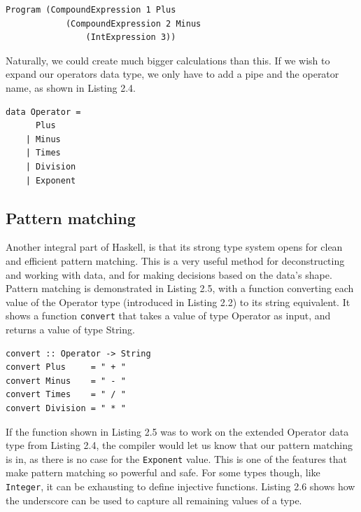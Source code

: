 \begin{lstlisting}[caption={An AST constructed with data types presented in Listing 2.2}, captionpos=b]
Program (CompoundExpression 1 Plus
            (CompoundExpression 2 Minus
                (IntExpression 3))
\end{lstlisting}

Naturally, we could create much bigger calculations than this. If we wish to expand our operators data type, we only have to add a pipe and the operator name, as shown in Listing 2.4. \hfill \\

\begin{lstlisting}[caption={An extended version of the Operator data type presented in Listing 2.2}, captionpos=b]
data Operator =
      Plus
    | Minus
    | Times
    | Division
    | Exponent
\end{lstlisting}

\subsection{Pattern matching}

Another integral part of Haskell, is that its strong type system opens for clean and efficient pattern matching. This is a very useful method for deconstructing and working with data, and for making decisions based on the data's shape. \hfill \\

Pattern matching is demonstrated in Listing 2.5, with a function converting each value of the Operator type (introduced in Listing 2.2) to its string equivalent. It shows a function \texttt{convert} that takes a value of type Operator as input, and returns a value of type String. \hfill \\

\begin{lstlisting}[caption={Haskell function converting values of one type to another}, captionpos=b]
convert :: Operator -> String
convert Plus     = " + "
convert Minus    = " - "
convert Times    = " / "
convert Division = " * "
\end{lstlisting}

If the function shown in Listing 2.5 was to work on the extended Operator data type from Listing 2.4, the compiler would let us know that our pattern matching is in, as there is no case for the \texttt{Exponent} value. This is one of the features that make pattern matching so powerful and safe. For some types though, like \texttt{Integer}, it can be exhausting to define injective functions. Listing 2.6 shows how the underscore can be used to capture all remaining values of a type. \hfill \\

